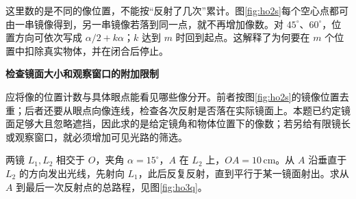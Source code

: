 \begin{solution}
这里数的是不同的像位置，不能按“反射了几次”累计。图\ref{fig:ho2s}每个空心点都可由一串镜像得到，另一串镜像若落到同一点，就不再增加像数。对 $45^\circ$、$60^\circ$，位置方向可依次写成 $\alpha/2+k\alpha$；$k$ 达到 $m$ 时回到起点。这解释了为何要在 $m$ 个位置中扣除真实物体，并在闭合后停止。



\par\medskip{}\noindent\textbf{检查镜面大小和观察窗口的附加限制}\par\nobreak
应将像的位置计数与具体眼点能看见哪些像分开。前者按图\ref{fig:ho2s}的镜像位置去重；后者还要从眼点向像连线，检查各次反射是否落在实际镜面上。本题已约定镜面足够大且忽略遮挡，因此求的是给定镜角和物体位置下的像数；若另给有限镜长或观察窗口，就必须增加可见光路的筛选。
\end{solution}

\begin{question}
\begin{example}[小夹角镜间的反复反射]\label{ex:ho3}
两镜 $L_1,L_2$ 相交于 $O$，夹角 $\alpha=15^\circ$，$A$ 在 $L_2$ 上，$OA=10\,\mathrm{cm}$。从 $A$ 沿垂直于 $L_2$ 的方向发出光线，先射向 $L_1$，此后反复反射，直到平行于某一镜面射出。求从 $A$ 到最后一次反射点的总路程，见图\ref{fig:ho3q}。
\end{example}
\end{question}

